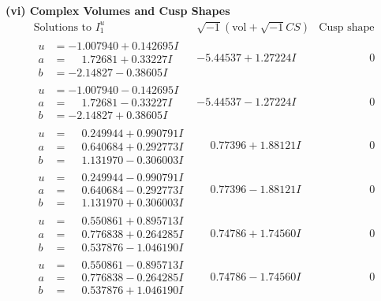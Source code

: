 \documentclass[1p]{elsarticle_modified}
\theoremstyle{definition}
\newcommand{\I}{\sqrt{-1}}
\begin{document}
\newpage\flushleft \textbf{(vi) Complex Volumes and Cusp Shapes}
$$\begin{array}{c|c|c}  
\text{Solutions to }I^u_{1}& \I (\text{vol} + \sqrt{-1}CS) & \text{Cusp shape}\\
 \hline 
\begin{aligned}
u &= -1.007940 + 0.142695 I \\
a &= \phantom{-}1.72681 + 0.33227 I \\
b &= -2.14827 - 0.38605 I\end{aligned}
 & -5.44537 + 1.27224 I & \phantom{-0.000000 } 0 \\ \hline\begin{aligned}
u &= -1.007940 - 0.142695 I \\
a &= \phantom{-}1.72681 - 0.33227 I \\
b &= -2.14827 + 0.38605 I\end{aligned}
 & -5.44537 - 1.27224 I & \phantom{-0.000000 } 0 \\ \hline\begin{aligned}
u &= \phantom{-}0.249944 + 0.990791 I \\
a &= \phantom{-}0.640684 + 0.292773 I \\
b &= \phantom{-}1.131970 - 0.306003 I\end{aligned}
 & \phantom{-}0.77396 + 1.88121 I & \phantom{-0.000000 } 0 \\ \hline\begin{aligned}
u &= \phantom{-}0.249944 - 0.990791 I \\
a &= \phantom{-}0.640684 - 0.292773 I \\
b &= \phantom{-}1.131970 + 0.306003 I\end{aligned}
 & \phantom{-}0.77396 - 1.88121 I & \phantom{-0.000000 } 0 \\ \hline\begin{aligned}
u &= \phantom{-}0.550861 + 0.895713 I \\
a &= \phantom{-}0.776838 + 0.264285 I \\
b &= \phantom{-}0.537876 - 1.046190 I\end{aligned}
 & \phantom{-}0.74786 + 1.74560 I & \phantom{-0.000000 } 0 \\ \hline\begin{aligned}
u &= \phantom{-}0.550861 - 0.895713 I \\
a &= \phantom{-}0.776838 - 0.264285 I \\
b &= \phantom{-}0.537876 + 1.046190 I\end{aligned}
 & \phantom{-}0.74786 - 1.74560 I & \phantom{-0.000000 } 0 \\ \hline\begin{aligned}

\end{aligned}
\end{array}$$
\end{document}
